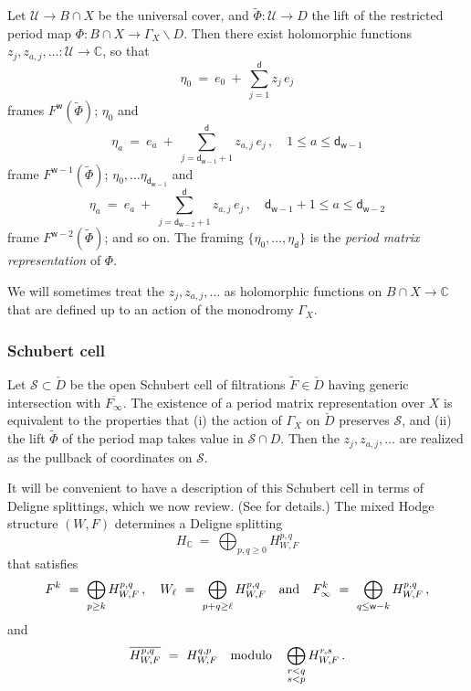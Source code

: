 \documentclass[12pt]{amsart}
\numberwithin{equation}{section}
\numberwithin{table}{section}
\def\bC{\mathbb{C}}
\def\sS{\mathscr{S}}
\def\cU{\mathcal{U}}
\def\sfw{\mathsf{w}}
\def\tand{\quad\hbox{and}\quad}
\def\bs{\backslash}
\theoremstyle{definition}
\theoremstyle{definition}
\theoremstyle{remark}
\def\bs{\backslash}
\def\sfd{\mathsf{d}}
\def\tPhi{\tilde\Phi}
\begin{document}
Let $\cU \to B \cap X$ be the universal cover, and $\tPhi : \cU \to D$ the lift of the restricted period map $\Phi : B \cap X \to \Gamma_X \bs D$.  Then there exist holomorphic functions $z_j,z_{a,j},\ldots : \cU \to \bC$, so that 
\[
  \eta_0 \ = \ e_0 \ + \ \sum_{j=1}^\sfd z_j\,e_j
\]
frames $F^\sfw(\tPhi)$;  $\eta_0$ and 
\[
  \eta_a \ = \ e_a \ + \ \sum_{j=\sfd_{\sfw-1}+1}^\sfd z_{a,j}\,e_j 
  \,,\quad
  1 \le a \le \sfd_{\sfw-1}
\]
frame $F^{\sfw-1}(\tPhi)$; $\eta_0,\ldots\eta_{\sfd_{\sfw-1}}$ and 
\[
  \eta_a \ = \ e_a \ + \ \sum_{j=\sfd_{\sfw-2}+1}^\sfd z_{a,j}\,e_j 
  \,,\quad
  \sfd_{\sfw-1} + 1 \le a \le \sfd_{\sfw-2}
\]
frame $F^{\sfw-2}(\tPhi)$; and so on.  The framing $\{ \eta_0,\ldots , \eta_\sfd\}$ is the \emph{period matrix representation} of $\Phi$.  

We will sometimes treat the $z_j,z_{a,j},\ldots$ as holomorphic functions on $B \cap X \to \bC$ that are defined up to an action of the monodromy $\Gamma_X$.

\subsubsection{Schubert cell} \label{S:gpq}

Let $\sS \subset \check D$ be the open Schubert cell of filtrations $\tilde F\in \check D$ having generic intersection with $\overline{F_\infty}$.  The existence of a period matrix representation over $X$ is equivalent to the properties that (i) the action of $\Gamma_X$ on $\check D$ preserves $\sS$, and (ii) the lift $\tPhi$ of the period map takes value in $\sS \cap D$. Then the $z_j, z_{a,j} , \ldots$ are realized as the pullback of coordinates on $\sS$.

It will be convenient to have a description of this Schubert cell in terms of Deligne splittings, which we now review.  (See \cite{MR3701983} for details.)  The mixed Hodge structure $(W,F)$ determines a Deligne splitting
\[
  H_\bC \ = \ \bigoplus_{p,q\ge0} H^{p,q}_{W,F}
\]
that satisfies 
\begin{equation}\label{E:dsfilts}
  F^k \ = \ \bigoplus_{p\ge k}  H^{p,q}_{W,F} \,,\quad
  W_\ell \ = \ \bigoplus_{p+q\ge\ell}  H^{p,q}_{W,F} \tand
  F^k_\infty \ = \ \bigoplus_{q\le \sfw-k}  H^{p,q}_{W,F} \,,
\end{equation}
and
\[
  \overline{H^{p,q}_{W,F}} \ = \ H^{q,p}_{W,F}
  \quad\hbox{modulo}\quad 
  \bigoplus_{\substack{r<q \\ s<p}} H^{r,s}_{W,F} \,.
\]
\end{document}
